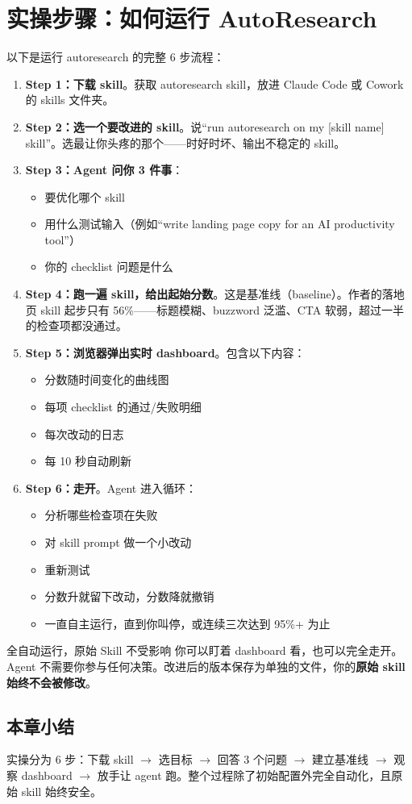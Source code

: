 \section{实操步骤：如何运行 AutoResearch}

以下是运行 autoresearch 的完整 6 步流程：

\begin{enumerate}
    \item \textbf{Step 1：下载 skill}。获取 autoresearch skill，放进 Claude Code 或 Cowork 的 skills 文件夹。

    \item \textbf{Step 2：选一个要改进的 skill}。说``run autoresearch on my [skill name] skill''。选最让你头疼的那个——时好时坏、输出不稳定的 skill。

    \item \textbf{Step 3：Agent 问你 3 件事}：
    \begin{itemize}
        \item 要优化哪个 skill
        \item 用什么测试输入（例如``write landing page copy for an AI productivity tool''）
        \item 你的 checklist 问题是什么
    \end{itemize}

    \item \textbf{Step 4：跑一遍 skill，给出起始分数}。这是基准线（baseline）。作者的落地页 skill 起步只有 56\%——标题模糊、buzzword 泛滥、CTA 软弱，超过一半的检查项都没通过。

    \item \textbf{Step 5：浏览器弹出实时 dashboard}。包含以下内容：
    \begin{itemize}
        \item 分数随时间变化的曲线图
        \item 每项 checklist 的通过/失败明细
        \item 每次改动的日志
        \item 每 10 秒自动刷新
    \end{itemize}

    \item \textbf{Step 6：走开}。Agent 进入循环：
    \begin{itemize}
        \item 分析哪些检查项在失败
        \item 对 skill prompt 做一个小改动
        \item 重新测试
        \item 分数升就留下改动，分数降就撤销
        \item 一直自主运行，直到你叫停，或连续三次达到 95\%+ 为止
    \end{itemize}
\end{enumerate}

\begin{importantbox}{全自动运行，原始 Skill 不受影响}
你可以盯着 dashboard 看，也可以完全走开。Agent 不需要你参与任何决策。改进后的版本保存为单独的文件，你的\textbf{原始 skill 始终不会被修改}。
\end{importantbox}

\subsection{本章小结}

实操分为 6 步：下载 skill $\to$ 选目标 $\to$ 回答 3 个问题 $\to$ 建立基准线 $\to$ 观察 dashboard $\to$ 放手让 agent 跑。整个过程除了初始配置外完全自动化，且原始 skill 始终安全。

